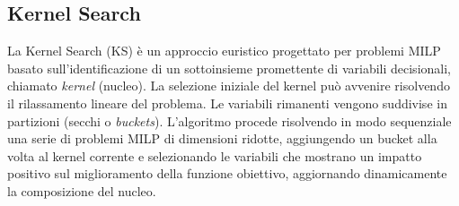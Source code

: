 \subsection{Kernel Search}
\label{subsec:kernel-search}

La Kernel Search (KS) \cite{maniezzo2021matheuristics} è un approccio euristico progettato per problemi MILP basato sull'identificazione di un sottoinsieme promettente di variabili decisionali, chiamato \textit{kernel} (nucleo). La selezione iniziale del kernel può avvenire risolvendo il rilassamento lineare del problema. Le variabili rimanenti vengono suddivise in partizioni (secchi o \textit{buckets}). L'algoritmo procede risolvendo in modo sequenziale una serie di problemi MILP di dimensioni ridotte, aggiungendo un bucket alla volta al kernel corrente e selezionando le variabili che mostrano un impatto positivo sul miglioramento della funzione obiettivo, aggiornando dinamicamente la composizione del nucleo.
